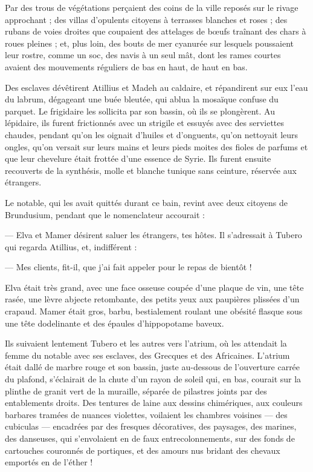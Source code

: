\documentclass[a4paper, 11pt, oneside, polutonikogreek, french]{article}
\begin{document}
Par des trous de végétations perçaient des coins de la ville reposés sur le rivage approchant ; des villas d'opulents citoyens à terrasses blanches et roses ; des rubans de voies droites que coupaient des attelages de bœufs traînant des chars à roues pleines ; et, plus loin, des bouts de mer cyanurée sur lesquels poussaient leur rostre, comme un soc, des navis à un seul mât, dont les rames courtes avaient des mouvements réguliers de bas en haut, de haut en bas.

Des esclaves dévêtirent Atillius et Madeh au caldaire, et répandirent sur eux l'eau du labrum, dégageant une buée bleutée, qui ablua la mosaïque confuse du parquet. Le frigidaire les sollicita par son bassin, où ils se plongèrent. Au lépidaire, ils furent frictionnés avec un strigile et essuyés avec des serviettes chaudes, pendant qu'on les oignait d'huiles et d'onguents, qu'on nettoyait leurs ongles, qu'on versait sur leurs mains et leurs pieds moites des fioles de parfums et que leur chevelure était frottée d'une essence de Syrie. Ils furent ensuite recouverts de la synthésis, molle et blanche tunique sans ceinture, réservée aux étrangers.

Le notable, qui les avait quittés durant ce bain, revint avec deux citoyens de Brundusium, pendant que le nomenclateur accourait :

--- Elva et Mamer désirent saluer les étrangers, tes hôtes. Il s'adressait à Tubero qui regarda Atillius, et, indifférent :

--- Mes clients, fit-il, que j'ai fait appeler pour le repas de bientôt !

Elva était très grand, avec une face osseuse coupée d'une plaque de vin, une tête rasée, une lèvre abjecte retombante, des petits yeux aux paupières plissées d'un crapaud. Mamer était gros, barbu, bestialement roulant une obésité flasque sous une tête dodelinante et des épaules d'hippopotame baveux.

Ils suivaient lentement Tubero et les autres vers l'atrium, où les attendait la femme du notable avec ses esclaves, des Grecques et des Africaines. L'atrium était dallé de marbre rouge et son bassin, juste au-dessous de l'ouverture carrée du plafond, s'éclairait de la chute d'un rayon de soleil qui, en bas, courait sur la plinthe de granit vert de la muraille, séparée de pilastres joints par des entablements droits. Des tentures de laine aux dessins chimériques, aux couleurs barbares tramées de nuances violettes, voilaient les chambres voisines --- des cubiculas --- encadrées par des fresques décoratives, des paysages, des marines, des danseuses, qui s'envolaient en de faux entrecolonnements, sur des fonds de cartouches couronnés de portiques, et des amours nus bridant des chevaux emportés en de l'éther !
\end{document}
